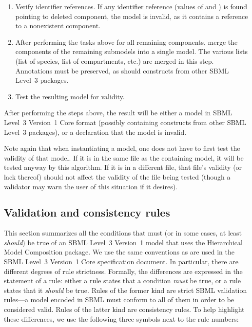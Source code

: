 \begin{enumerate}
\item Verify identifier references.  If any identifier reference (values
  of  and ) is found pointing to deleted
  component, the model is invalid, as it contains a reference to a
  nonexistent component.

\item After performing the tasks above for all remaining components,
  merge the components of the remaining submodels into a single model.
  The various lists (list of species, list of compartments, etc.) are
  merged in this step.  Annotations must be preserved, as should
  constructs from other SBML Level~3 packages.

\item Test the resulting model for validity.

\end{enumerate}

After performing the steps above, the result will be either a model in
SBML Level~3 Version~1 Core format (possibly containing constructs from
other SBML Level~3 packages), or a declaration that the model is invalid.

Note again that when instantiating a model, one does not have to first
test the validity of that model.  If it is in the same file as the
containing model, it will be tested anyway by this algorithm.  If it is
in a different file, that file's validity (or lack thereof) should not
affect the validity of the file being tested (though a validator may
warn the user of this situation if it desires).


\subsection{Validation and consistency rules}
\label{validation-rules}

This section summarizes all the conditions that must (or in some cases,
at least \emph{should}) be true of an SBML Level~3 Version~1 model that
uses the Hierarchical Model Composition package.  We use the same
conventions as are used in the SBML Level~3 Version~1 Core specification
document.  In particular, there are different degrees of rule
strictness.  Formally, the differences are expressed in the statement of
a rule: either a rule states that a condition \emph{must} be true, or a
rule states that it \emph{should} be true.  Rules of the former kind are
strict SBML validation rules---a model encoded in SBML must conform to
all of them in order to be considered valid.  Rules of the latter kind
are consistency rules.  To help highlight these differences, we use the
following three symbols next to the rule numbers:

